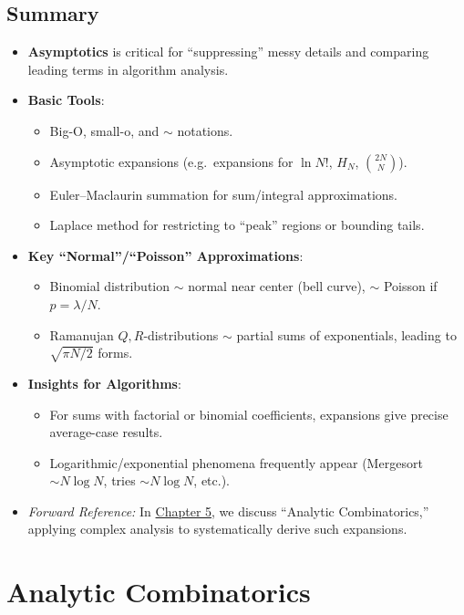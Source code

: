 \documentclass[11pt,letterpaper]{article}
\begin{document}
\subsection{Summary}
\begin{itemize}
  \item \textbf{Asymptotics} is critical for “suppressing” messy details and comparing leading terms in algorithm analysis.
  \item \textbf{Basic Tools}:
    \begin{itemize}
      \item Big-O, small-o, and $\sim$ notations.
      \item Asymptotic expansions (e.g.\ expansions for $\ln N!$, $H_N$, $\binom{2N}{N}$).
      \item Euler--Maclaurin summation for sum/integral approximations.
      \item Laplace method for restricting to “peak” regions or bounding tails.
    \end{itemize}
  \item \textbf{Key “Normal”/“Poisson” Approximations}: 
    \begin{itemize}
      \item Binomial distribution $\sim$ normal near center (bell curve), $\sim$ Poisson if $p=\lambda/N$.
      \item Ramanujan $Q,R$-distributions $\sim$ partial sums of exponentials, leading to $\sqrt{\pi N/2}$ forms.
    \end{itemize}
  \item \textbf{Insights for Algorithms}:
    \begin{itemize}
      \item For sums with factorial or binomial coefficients, expansions give precise average-case results.
      \item Logarithmic/exponential phenomena frequently appear (Mergesort $\sim N\log N$, tries $\sim N\log N$, etc.).
    \end{itemize}
  \item \emph{Forward Reference:} In \hyperref[ch:analytic-comb]{Chapter 5}, we discuss “Analytic Combinatorics,” applying complex analysis to systematically derive such expansions. 
\end{itemize}
\clearpage

\section{Analytic Combinatorics}
\end{document}

